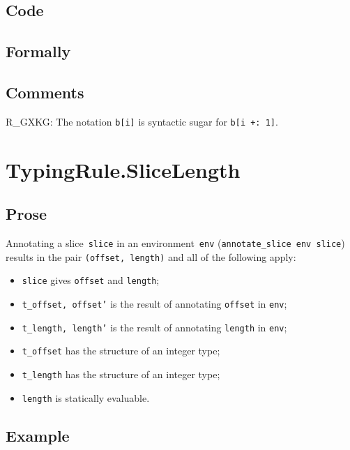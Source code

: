 \documentclass{book}
\begin{document}
  \subsection{Code}

\begin{emptyformal}
    \subsection{Formally}
\end{emptyformal}

\subsection{Comments}
    R\_GXKG: The notation \texttt{b[i]} is syntactic sugar for \texttt{b[i +: 1]}.

\section{TypingRule.SliceLength \label{sec:TypingRule.SliceLength}}

  \subsection{Prose}
   Annotating a slice~\texttt{slice} in an environment~\texttt{env}
(\texttt{annotate\_slice env slice}) results in the pair \texttt{(offset,
length)} and all of the following apply:
   \begin{itemize}
   \item \texttt{slice} gives \texttt{offset} and \texttt{length}; 
   \item \texttt{t\_offset, offset'} is the result of annotating \texttt{offset} in \texttt{env};
   \item \texttt{t\_length, length'} is the result of annotating \texttt{length} in \texttt{env};
   \item \texttt{t\_offset} has the structure of an integer type;
   \item \texttt{t\_length} has the structure of an integer type;
   \item \texttt{length} is statically evaluable.
   \end{itemize}

  \subsection{Example}
\end{document}
